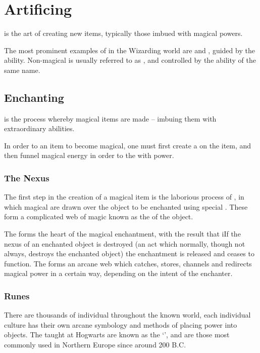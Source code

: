 \chapter{Artificing}\label{S:Artificing}


 is the art of creating new items, typically those imbued with magical powers. 

The most prominent examples of  in the Wizarding world are  and , guided by the  ability. Non-magical  is usually referred to as , and controlled by the ability of the same name.  

\section{Enchanting}
\label{S:Enchanting}

 is the process whereby magical items are made – imbuing them with extraordinary abilities. 

In order to  an item to become magical, one must first create a  on the item, and then funnel magical energy in order to  the  with power.  

\subsection{The Nexus}

The first step in the creation of a magical item is the laborious process of , in which magical  are drawn over the object to be enchanted using special . These  form a complicated web of magic known as the  of the object. 


The  forms the heart of the magical enchantment, with the result that iIf the nexus of an enchanted object is destroyed (an act which normally, though not always, destroys the enchanted object) the enchantment is released and ceases to function. The  forms an arcane web which catches, stores, channels and redirects magical power in a certain way, depending on the intent of the enchanter. 


\subsection{Runes}

There are thousands of individual  throughout the known world, each individual culture has their own arcane symbology and methods of placing power into objects. The  taught at Hogwarts are known as the `', and are those most commonly used in Northern Europe since around 200 B.C.

